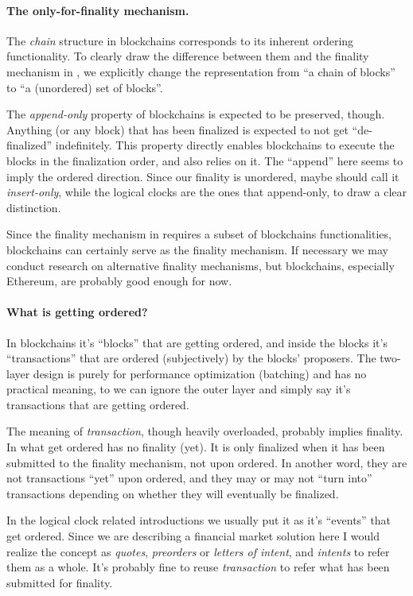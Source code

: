 \paragraph{The only-for-finality mechanism.}
The \emph{chain} structure in blockchains corresponds to its inherent ordering functionality.
To clearly draw the difference between them and the finality mechanism in \sys, we explicitly change the representation from ``a chain of blocks'' to ``a (unordered) set of blocks''.

The \emph{append-only} property of blockchains is expected to be preserved, though.
Anything (or any block) that has been finalized is expected to not get ``de-finalized'' indefinitely.
This property directly enables blockchains to execute the blocks in the finalization order, and \sys also relies on it.
The ``append'' here seems to imply the ordered direction.
Since our finality is unordered, maybe should call it \emph{insert-only}, while the logical clocks are the ones that append-only, to draw a clear distinction.

Since the finality mechanism in \sys requires a subset of blockchains functionalities, blockchains can certainly serve as the finality mechanism.
If necessary we may conduct research on alternative finality mechanisms, but blockchains, especially Ethereum, are probably good enough for now.

\paragraph{What is getting ordered?}
In blockchains it's ``blocks'' that are getting ordered, and inside the blocks it's ``transactions'' that are ordered (subjectively) by the blocks' proposers.
The two-layer design is purely for performance optimization (\ie batching) and has no practical meaning, to we can ignore the outer layer and simply say it's transactions that are getting ordered.

The meaning of \emph{transaction}, though heavily overloaded, probably implies finality.
In \sys what get ordered has no finality (yet).
It is only finalized when it has been submitted to the finality mechanism, not upon ordered.
In another word, they are not transactions ``yet'' upon ordered, and they may or may not ``turn into'' transactions depending on whether they will eventually be finalized.

In the logical clock related introductions we usually put it as it's ``events'' that get ordered.
Since we are describing a financial market solution here I would realize the concept as \emph{quotes}, \emph{preorders} or \emph{letters of intent}, and \emph{intents} to refer them as a whole.
It's probably fine to reuse \emph{transaction} to refer what has been submitted for finality.

